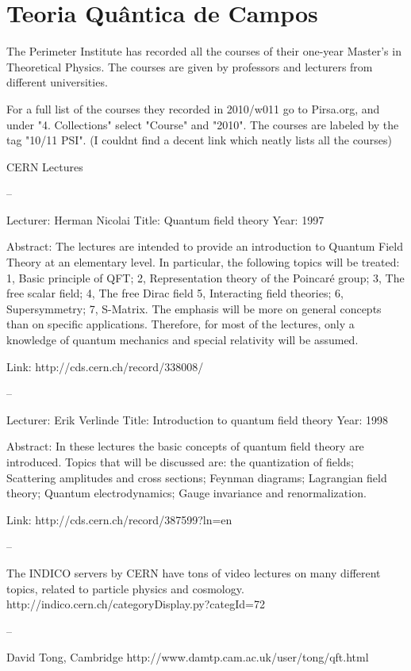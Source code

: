 \section{Teoria Quântica de Campos}

The Perimeter Institute has recorded all the courses of their one-year Master's in Theoretical Physics. The courses are given by professors and lecturers from different universities.

For a full list of the courses they recorded in 2010/w011 go to Pirsa.org, and under "4. Collections" select "Course" and "2010". The courses are labeled by the tag "10/11 PSI". (I couldnt find a decent link which neatly lists all the courses)


CERN Lectures

--

Lecturer: Herman Nicolai
Title: Quantum field theory
Year: 1997

Abstract: The lectures are intended to provide an introduction to Quantum Field Theory at an elementary level. In particular, the following topics will be treated: 1, Basic principle of QFT; 2, Representation theory of the Poincaré group; 3, The free scalar field; 4, The free Dirac field 5, Interacting field theories; 6, Supersymmetry; 7, S-Matrix. The emphasis will be more on general concepts than on specific applications. Therefore, for most of the lectures, only a knowledge of quantum mechanics and special relativity will be assumed.

Link: http://cds.cern.ch/record/338008/

--

Lecturer: Erik Verlinde
Title: Introduction to quantum field theory
Year: 1998

Abstract: In these lectures the basic concepts of quantum field theory are introduced. Topics that will be discussed are: the quantization of fields; Scattering amplitudes and cross sections; Feynman diagrams; Lagrangian field theory; Quantum electrodynamics; Gauge invariance and renormalization.

Link: http://cds.cern.ch/record/387599?ln=en

--

The INDICO servers by CERN have tons of video lectures on many different topics, related to particle physics and cosmology.
http://indico.cern.ch/categoryDisplay.py?categId=72

--

David Tong, Cambridge
http://www.damtp.cam.ac.uk/user/tong/qft.html

